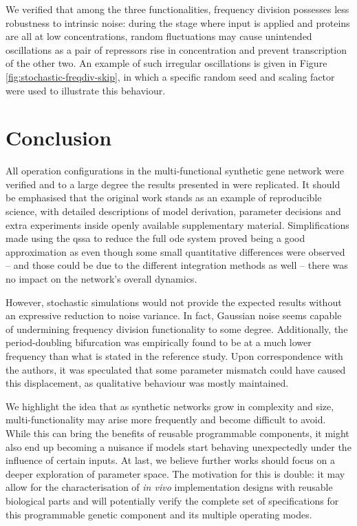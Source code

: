    We verified that among the three functionalities, frequency division possesses less robustness to intrinsic noise: during the stage where input is applied and proteins are all at low concentrations, random fluctuations may cause unintended oscillations as a pair of repressors rise in concentration and prevent transcription of the other two.
    An example of such irregular oscillations is given in Figure \ref{fig:stochastic-freqdiv-skip}, in which a specific random seed and scaling factor were used to illustrate this behaviour.


\section{Conclusion}

  All operation configurations in the multi-functional synthetic gene network were verified and to a large degree the results presented in \cite{multif} were replicated.
  It should be emphasised that the original work stands as an example of reproducible science, with detailed descriptions of model derivation, parameter decisions and extra experiments inside openly available supplementary material.
  Simplifications made using the \ac{qssa} to reduce the full \ac{ode} system proved being a good approximation as even though some small quantitative differences were observed -- and those could be due to the different integration methods as well -- there was no impact on the network's overall dynamics.

  However, stochastic simulations would not provide the expected results without an expressive reduction to noise variance.
  In fact, Gaussian noise seems capable of undermining frequency division functionality to some degree.
  Additionally, the period-doubling bifurcation was empirically found to be at a much lower frequency than what is stated in the reference study.
  Upon correspondence with the authors, it was speculated that some parameter mismatch could have caused this displacement, as qualitative behaviour was mostly maintained.

  We highlight the idea that as synthetic networks grow in complexity and size, multi-functionality may arise more frequently and become difficult to avoid.
  While this can bring the benefits of reusable programmable components, it might also end up becoming a nuisance if models start behaving unexpectedly under the influence of certain inputs.
  At last, we believe further works should focus on a deeper exploration of parameter space.
  The motivation for this is double: it may allow for the characterisation of \textit{in vivo} implementation designs with reusable biological parts and will potentially verify the complete set of specifications for this programmable genetic component and its multiple operating modes.
